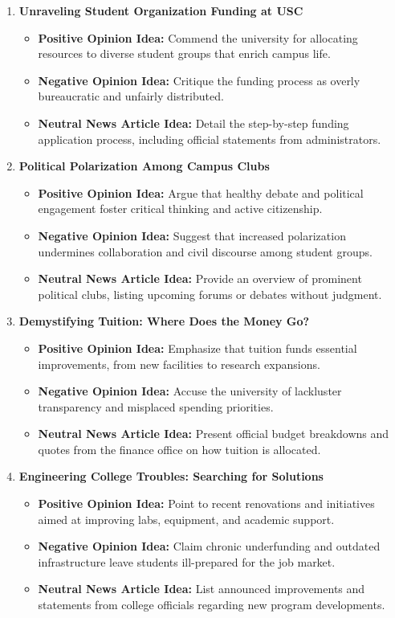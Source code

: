 \documentclass{article}
\begin{document}
\begin{enumerate}
    \item \textbf{Unraveling Student Organization Funding at USC}
    \begin{itemize}
        \item \textbf{Positive Opinion Idea:} Commend the university for allocating resources to diverse student groups that enrich campus life.
        \item \textbf{Negative Opinion Idea:} Critique the funding process as overly bureaucratic and unfairly distributed.
        \item \textbf{Neutral News Article Idea:} Detail the step-by-step funding application process, including official statements from administrators.
    \end{itemize}

    \item \textbf{Political Polarization Among Campus Clubs}
    \begin{itemize}
        \item \textbf{Positive Opinion Idea:} Argue that healthy debate and political engagement foster critical thinking and active citizenship.
        \item \textbf{Negative Opinion Idea:} Suggest that increased polarization undermines collaboration and civil discourse among student groups.
        \item \textbf{Neutral News Article Idea:} Provide an overview of prominent political clubs, listing upcoming forums or debates without judgment.
    \end{itemize}

    \item \textbf{Demystifying Tuition: Where Does the Money Go?}
    \begin{itemize}
        \item \textbf{Positive Opinion Idea:} Emphasize that tuition funds essential improvements, from new facilities to research expansions.
        \item \textbf{Negative Opinion Idea:} Accuse the university of lackluster transparency and misplaced spending priorities.
        \item \textbf{Neutral News Article Idea:} Present official budget breakdowns and quotes from the finance office on how tuition is allocated.
    \end{itemize}

    \item \textbf{Engineering College Troubles: Searching for Solutions}
    \begin{itemize}
        \item \textbf{Positive Opinion Idea:} Point to recent renovations and initiatives aimed at improving labs, equipment, and academic support.
        \item \textbf{Negative Opinion Idea:} Claim chronic underfunding and outdated infrastructure leave students ill-prepared for the job market.
        \item \textbf{Neutral News Article Idea:} List announced improvements and statements from college officials regarding new program developments.
    \end{itemize}


\end{enumerate}
\end{document}
